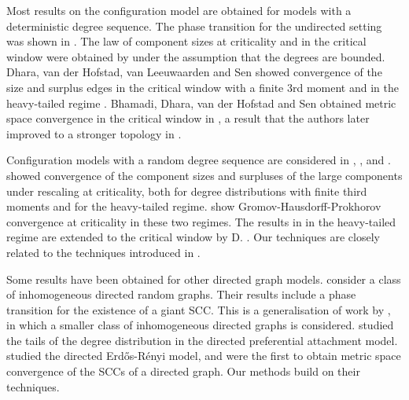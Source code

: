Most results on the configuration model are obtained for models with a deterministic degree sequence. The phase transition for the undirected setting was shown in \cite{molloyCriticalPointRandom1995, Molloy1998, Janson2009}. The law of component sizes at criticality and in the critical window were obtained by \citet{Riordan2012} under the assumption that the degrees are bounded. Dhara, van der Hofstad, van Leeuwaarden and Sen showed convergence of the size and surplus edges in the critical window with a finite 3rd moment \cite{Dhara2017} and in the heavy-tailed regime \cite{Dhara2020}.  Bhamadi, Dhara, van der Hofstad and Sen obtained metric space convergence in the critical window in \cite{Bhamidi2020}, a result that the authors later improved to a stronger topology in \cite{Bhamidi2020Glmb}. 

Configuration models with a random degree sequence are considered in \cite{josephComponentSizesCritical2014}, \cite{conchon--kerjanStableGraphMetric2020}, and \cite{Donderwinkel2021heightprocess}. \citet{josephComponentSizesCritical2014} showed convergence of the component sizes and surpluses of the large components under rescaling at criticality, both for degree distributions with finite third moments and for the heavy-tailed regime. \citet{conchon--kerjanStableGraphMetric2020} show Gromov-Hausdorff-Prokhorov convergence at criticality in these two regimes. The results in \cite{conchon--kerjanStableGraphMetric2020} in the heavy-tailed regime are extended to the critical window by D. \cite{Donderwinkel2021heightprocess}. Our techniques are closely related to the techniques introduced in \cite{conchon--kerjanStableGraphMetric2020}. 

Some results have been obtained for other directed graph models. \citet{caoConnectivityGeneralClass2019} consider a class of inhomogeneous directed random graphs. Their results include a phase transition for the existence of a giant SCC. This is a generalisation of work by \citet{Bloznelis2012}, in which a smaller class of inhomogeneous directed graphs is considered. \citet{Samorodnitsky2016} studied the tails of the degree distribution in the directed preferential attachment model. \citet{goldschmidtScalingLimitCritical2019} studied the directed Erd\H{o}s-R\'enyi model, and were the first to obtain metric space convergence of the SCCs of a directed graph. Our methods build on their techniques.

